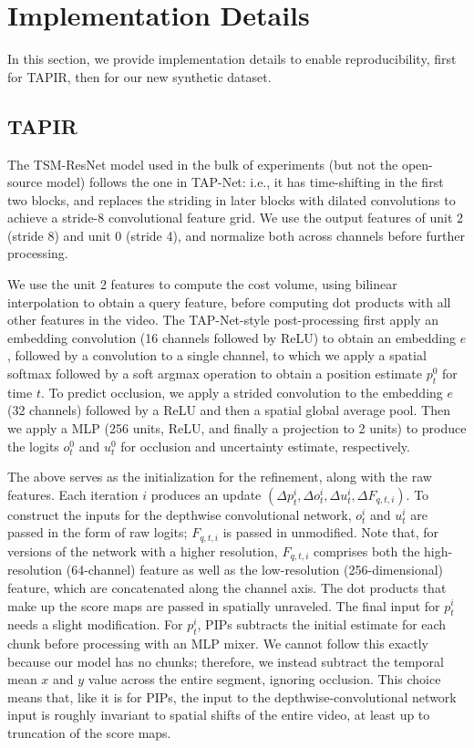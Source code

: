 \documentclass[10pt,twocolumn,letterpaper]{article}
\begin{document}
\section{Implementation Details}
\label{sec:impl}
In this section, we provide implementation details to enable reproducibility, first for TAPIR, then for our new synthetic dataset.

\subsection{TAPIR}
\label{sec:tapir_details}
The TSM-ResNet model used in the bulk of experiments (but not the open-source model) follows the one in TAP-Net: i.e., it has time-shifting in the first two blocks, and replaces the striding in later blocks with dilated convolutions to achieve a stride-8 convolutional feature grid.  We use the output features of unit 2 (stride 8) and unit 0 (stride 4), and normalize both across channels before further processing.

We use the unit 2 features to compute the cost volume, using bilinear interpolation to obtain a query feature, before computing dot products with all other features in the video.  The TAP-Net-style post-processing first apply an embedding convolution (16 channels followed by ReLU) to obtain an embedding $e$, followed by a convolution to a single channel, to which we apply a spatial softmax followed by a soft argmax operation to obtain a position estimate $p^{0}_{t}$ for time $t$.  To predict occlusion, we apply a strided convolution to the embedding $e$ (32 channels) followed by a ReLU and then a spatial global average pool.  Then we apply a MLP (256 units, ReLU, and finally a projection to 2 units) to produce the logits $o^{0}_{t}$ and $u^{0}_{t}$ for occlusion and uncertainty estimate, respectively. 

The above serves as the initialization for the refinement, along with the raw features.  Each iteration $i$ produces an update $(\Delta p^i_t, \Delta o^i_t, \Delta u^i_t, \Delta F_{q,t,i})$.  To construct the inputs for the depthwise convolutional network, $o^i_t$  and $u^i_t$ are passed in the form of raw logits; $F_{q,t,i}$ is passed in unmodified.  Note that, for versions of the network with a higher resolution, $F_{q,t,i}$ comprises both the high-resolution (64-channel) feature as well as the low-resolution (256-dimensional) feature, which are concatenated along the channel axis.  The dot products that make up the score maps are passed in spatially unraveled.  The final input for $p^{i}_t$ needs a slight modification.  For $p^i_t$, PIPs subtracts the initial estimate for each chunk before processing with an MLP mixer.  We cannot follow this exactly because our model has no chunks; therefore, we instead subtract the temporal mean $x$ and $y$ value across the entire segment, ignoring occlusion.  This choice means that, like it is for PIPs, the input to the depthwise-convolutional network input is roughly invariant to spatial shifts of the entire video, at least up to truncation of the score maps.  
\end{document}
